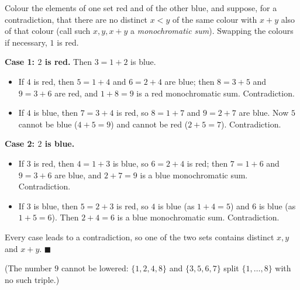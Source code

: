 Colour the elements of one set red and of the other blue, and suppose, for a contradiction, that there are no distinct $x<y$ of the same colour with $x+y$ also of that colour (call such $x,y,x+y$ a \emph{monochromatic sum}). Swapping the colours if necessary, $1$ is red.

\textbf{Case 1: $2$ is red.} Then $3=1+2$ is blue.
\begin{itemize}
\item If $4$ is red, then $5=1+4$ and $6=2+4$ are blue; then $8=3+5$ and $9=3+6$ are red, and $1+8=9$ is a red monochromatic sum. Contradiction.
\item If $4$ is blue, then $7=3+4$ is red, so $8=1+7$ and $9=2+7$ are blue. Now $5$ cannot be blue ($4+5=9$) and cannot be red ($2+5=7$). Contradiction.
\end{itemize}

\textbf{Case 2: $2$ is blue.}
\begin{itemize}
\item If $3$ is red, then $4=1+3$ is blue, so $6=2+4$ is red; then $7=1+6$ and $9=3+6$ are blue, and $2+7=9$ is a blue monochromatic sum. Contradiction.
\item If $3$ is blue, then $5=2+3$ is red, so $4$ is blue (as $1+4=5$) and $6$ is blue (as $1+5=6$). Then $2+4=6$ is a blue monochromatic sum. Contradiction.
\end{itemize}
Every case leads to a contradiction, so one of the two sets contains distinct $x,y$ and $x+y$. $\blacksquare$

(The number $9$ cannot be lowered: $\{1,2,4,8\}$ and $\{3,5,6,7\}$ split $\{1,\dots,8\}$ with no such triple.)
